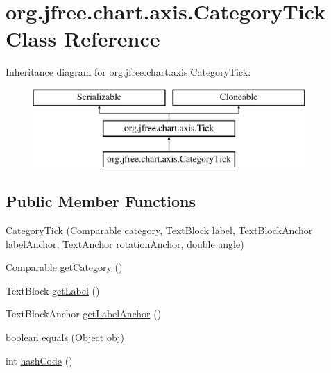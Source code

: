\hypertarget{classorg_1_1jfree_1_1chart_1_1axis_1_1_category_tick}{}\section{org.\+jfree.\+chart.\+axis.\+Category\+Tick Class Reference}
\label{classorg_1_1jfree_1_1chart_1_1axis_1_1_category_tick}
Inheritance diagram for org.\+jfree.\+chart.\+axis.\+Category\+Tick\+:\begin{figure}[H]
\begin{center}
\leavevmode
\includegraphics[height=3.000000cm]{classorg_1_1jfree_1_1chart_1_1axis_1_1_category_tick}
\end{center}
\end{figure}
\subsection*{Public Member Functions}
\begin{DoxyCompactItemize}
\item 
\mbox{\hyperlink{classorg_1_1jfree_1_1chart_1_1axis_1_1_category_tick_a0480950bc5fd1c13d7ea95dd72c35919}{Category\+Tick}} (Comparable category, Text\+Block label, Text\+Block\+Anchor label\+Anchor, Text\+Anchor rotation\+Anchor, double angle)
\item 
Comparable \mbox{\hyperlink{classorg_1_1jfree_1_1chart_1_1axis_1_1_category_tick_a9fdb2b94c359cfe7a15d69bf3cbed845}{get\+Category}} ()
\item 
Text\+Block \mbox{\hyperlink{classorg_1_1jfree_1_1chart_1_1axis_1_1_category_tick_ac6a2970804e77a025c22784c3c35071d}{get\+Label}} ()
\item 
Text\+Block\+Anchor \mbox{\hyperlink{classorg_1_1jfree_1_1chart_1_1axis_1_1_category_tick_abca079cdba0d6f35e6ecb2758502ccd6}{get\+Label\+Anchor}} ()
\item 
boolean \mbox{\hyperlink{classorg_1_1jfree_1_1chart_1_1axis_1_1_category_tick_a3046d007fc4b41c2df75d5aade56b0bf}{equals}} (Object obj)
\item 
int \mbox{\hyperlink{classorg_1_1jfree_1_1chart_1_1axis_1_1_category_tick_a316eccf4be94977eb346a39148c14ddd}{hash\+Code}} ()
\end{DoxyCompactItemize}



